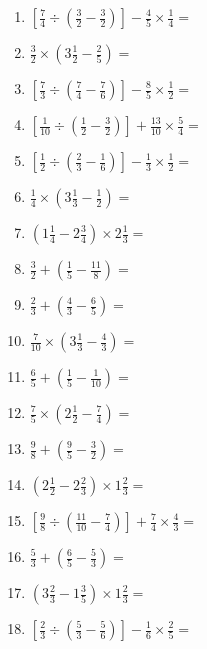 \documentclass[12pt]{article}
\begin{document}
\begin{enumerate}[ itemsep=1.5cm]
	\item $\displaystyle \left[ \frac{7}{4} \div \left( \frac{3}{2} - \frac{3}{2} \right) \right] - \frac{4}{5} \times \frac{1}{4} =$
	\item $\displaystyle \frac{3}{2} \times \left( 3 \frac{1}{2} - \frac{2}{5} \right) =$
	\item $\displaystyle \left[ \frac{7}{3} \div \left( \frac{7}{4} - \frac{7}{6} \right) \right] - \frac{8}{5} \times \frac{1}{2} =$
	\item $\displaystyle \left[ \frac{1}{10} \div \left( \frac{1}{2} - \frac{3}{2} \right) \right] + \frac{13}{10} \times \frac{5}{4} =$
	\item $\displaystyle \left[ \frac{1}{2} \div \left( \frac{2}{3} - \frac{1}{6} \right) \right] - \frac{1}{3} \times \frac{1}{2} =$
	\item $\displaystyle \frac{1}{4} \times \left( 3 \frac{1}{3} - \frac{1}{2} \right) =$
	\item $\displaystyle \left( 1 \frac{1}{4} - 2 \frac{3}{4} \right) \times 2 \frac{1}{3} =$
	\item $\displaystyle \frac{3}{2} + \left( \frac{1}{5} - \frac{11}{8} \right) =$
	\item $\displaystyle \frac{2}{3} + \left( \frac{4}{3} - \frac{6}{5} \right) =$

	\item $\displaystyle \frac{7}{10} \times \left( 3 \frac{1}{3} - \frac{4}{3} \right) =$
	\item $\displaystyle \frac{6}{5} + \left( \frac{1}{5} - \frac{1}{10} \right) =$
	\item $\displaystyle \frac{7}{5} \times \left( 2 \frac{1}{2} - \frac{7}{4} \right) =$
	\item $\displaystyle \frac{9}{8} + \left( \frac{9}{5} - \frac{3}{2} \right) =$
	\item $\displaystyle \left( 2 \frac{1}{2} - 2 \frac{2}{3} \right) \times 1 \frac{2}{3} =$
	\item $\displaystyle \left[ \frac{9}{8} \div \left( \frac{11}{10} - \frac{7}{4} \right) \right] + \frac{7}{4} \times \frac{4}{3} =$
	\item $\displaystyle \frac{5}{3} + \left( \frac{6}{5} - \frac{5}{3} \right) =$
	\item $\displaystyle \left( 3 \frac{2}{3} - 1 \frac{3}{5} \right) \times 1 \frac{2}{3} =$
	\item $\displaystyle \left[ \frac{2}{3} \div \left( \frac{5}{3} - \frac{5}{6} \right) \right] - \frac{1}{6} \times \frac{2}{5} =$


\end{enumerate}
\end{document}
